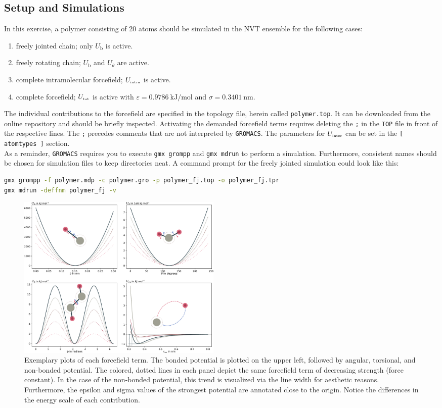 \documentclass[9pt,tutorial]{livecoms}
\newcommand{\code}[1]{\colorbox{light-gray}{\texttt{#1}}}
\begin{document}
\subsection*{Setup and Simulations}
In this exercise, a polymer consisting of 20 atoms should be simulated in the NVT ensemble for the following cases:
\begin{enumerate}
	\item freely jointed chain; only $U_\text{b}$ is active.
	\item freely rotating chain; $U_\text{b}$ and $U_\theta$ are active.
	\item complete intramolecular forcefield; $U_\text{\tiny intra}$ is active.
	\item complete forcefield; $U_\text{\tiny tot}$ is active with $\varepsilon=\SI{0.9786}{\kilo\joule\per\mole}$ and $\sigma=\SI{0.3401}{\nano\meter}$.
\end{enumerate} 
The individual contributions to the forcefield are specified in the topology file, herein called \code{polymer.top}. It can be downloaded from the online repository and should be briefly inspected. Activating the demanded forcefield terms requires deleting the \code{;} in the \texttt{TOP} file in front of the respective lines. The \code{;} precedes comments that are not interpreted by \texttt{GROMACS}. The parameters for $U_\text{\tiny inter}$ can be set in the \code{[ atomtypes ]} section.\\
As a reminder, \texttt{GROMACS} requires you to execute \code{gmx grompp} and \code{gmx mdrun} to perform a simulation. Furthermore, consistent names should be chosen for simulation files to keep directories neat. A command prompt for the freely jointed simulation could look like this:
\begin{lstlisting}[language=bash]
gmx grompp -f polymer.mdp -c polymer.gro -p polymer_fj.top -o polymer_fj.tpr
gmx mdrun -deffnm polymer_fj -v
\end{lstlisting}
\begin{figure}
    \centering
    \includegraphics[width=0.48\textwidth]{figures/forcefieldterms.pdf}
    \caption{Exemplary plots of each forcefield term. The bonded potential is plotted on the upper left, followed by angular, torsional, and non-bonded potential. The colored, dotted lines in each panel depict the same forcefield term of decreasing strength (force constant). In the case of the non-bonded potential, this trend is visualized via the line width for aesthetic reasons. Furthermore, the epsilon and sigma values of the strongest potential are annotated close to the origin. Notice the differences in the energy scale of each contribution.}
    \label{fig:ffterms}
\end{figure}
\end{document}
